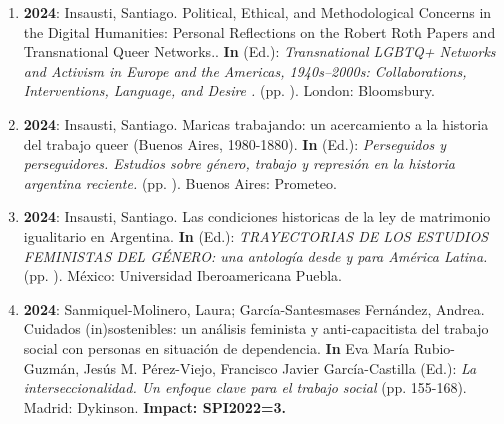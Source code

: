 \begin{enumerate}
\item {\bf 2024}: Insausti, Santiago. Political, Ethical, and Methodological Concerns in the Digital Humanities: Personal Reflections on the Robert Roth Papers and Transnational Queer Networks.. {\bf In}  (Ed.): {\it Transnational LGBTQ+ Networks and Activism in Europe and the Americas, 1940s–2000s: Collaborations, Interventions, Language, and Desire .} (pp. ). London: Bloomsbury. {\bf }\filbreak
\item {\bf 2024}: Insausti, Santiago. Maricas trabajando: un acercamiento a la historia del trabajo queer (Buenos Aires, 1980-1880). {\bf In}  (Ed.): {\it Perseguidos y perseguidores. Estudios sobre género, trabajo y represión en la historia argentina reciente.} (pp. ). Buenos Aires: Prometeo. {\bf }\filbreak
\item {\bf 2024}: Insausti, Santiago. Las condiciones historicas de la ley de matrimonio igualitario en Argentina. {\bf In}  (Ed.): {\it TRAYECTORIAS DE LOS ESTUDIOS FEMINISTAS DEL GÉNERO: una antología desde y para América Latina.} (pp. ). México: Universidad Iberoamericana Puebla. {\bf }\filbreak
\item {\bf 2024}: Sanmiquel-Molinero, Laura; García-Santesmases Fernández, Andrea. Cuidados (in)sostenibles: un análisis feminista y anti-capacitista del trabajo social con personas en situación de dependencia. {\bf In} Eva María Rubio-Guzmán, Jesús M. Pérez-Viejo, Francisco Javier García-Castilla (Ed.): {\it La interseccionalidad. Un enfoque clave para el trabajo social} (pp. 155-168). Madrid: Dykinson. {\bf Impact: SPI2022=3.}\filbreak
\end{enumerate} 
